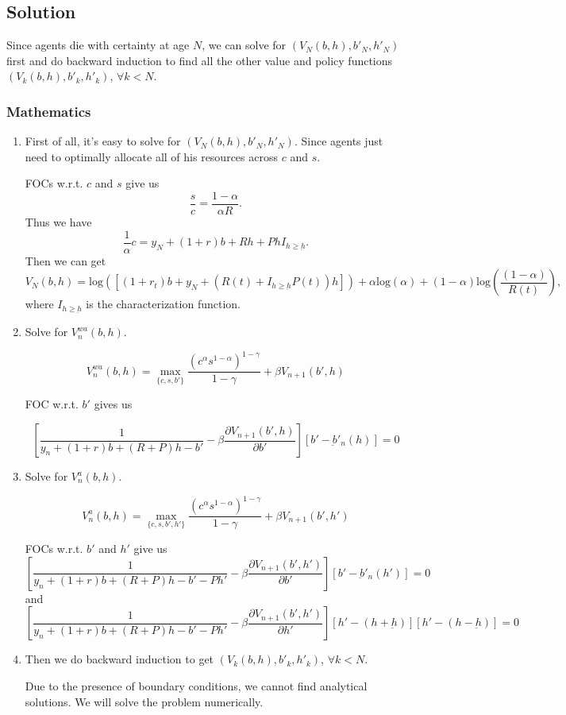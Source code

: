 \documentclass[a4paper,10pt]{article}
\newif\iffudongxingtongonly
\begin{document}
\iffudongxingtongonly
NTGB: What is the relationship between $P$ and $R$? Relatedly, how can we guarantee no one will hold a house level $0<h<\underbar{h}$ ever?
\fi

\pagebreak



\subsection*{Solution}

Since agents die with certainty at age $N$, we can solve for $(V_N(b,h),b'_N,h'_N)$ first and do backward induction to find all the other value and policy functions $(V_k(b,h),b'_k,h'_k)$, $\forall k<N$.


\subsubsection*{Mathematics}

\begin{enumerate}
  \item First of all, it's easy to solve for $(V_N(b,h),b'_N,h'_N)$. Since agents just need to optimally allocate all of his resources across $c$ and $s$.

  FOCs w.r.t. $c$ and $s$ give us
\[
\frac{s}{c}= \frac{1-\alpha}{\alpha R}.
\]
Thus we have
\[
\frac{1}{\alpha}c= y_N+(1+r)b+Rh+PhI_{h\ge\underbar{h}}.
\]
Then we can get
\[
V_N(b,h) = \mbox{log}([(1+r_t)b+y_N+(R(t)+I_{h\ge\underbar{h}} P(t))h])+\alpha\mbox{log}(\alpha)+(1-\alpha)\mbox{log}(\frac{(1-\alpha)}{R(t)}),
\]
 where $I_{h\ge\underbar{h}}$ is the characterization function.
  \item Solve for $V_n^{wa}(b,h)$.

\[
V_n^{wa}(b,h) = \max_{\{c, s, b'\}}  \frac{(c^\alpha s^{1-\alpha})^{1-\gamma}}{1-\gamma} + \beta V_{n+1}(b',h)
\]

FOC w.r.t. $b'$ gives us

\[
[\frac{1}{y_n+(1+r)b+(R+P)h-b'} - \beta \frac{\partial V_{n+1}(b',h)}{\partial b'}][b'-\underbar{b}'_n(h)]=0
\]


  \item Solve for $V_n^{a}(b,h)$.

  \[
V_n^{a}(b,h) = \max_{\{c, s, b',h'\}}  \frac{(c^\alpha s^{1-\alpha})^{1-\gamma}}{1-\gamma} + \beta V_{n+1}(b',h')
\]

FOCs w.r.t. $b'$ and $h'$ give us
\[
[\frac{1}{y_n+(1+r)b+(R+P)h-b'-Ph'} - \beta \frac{\partial V_{n+1}(b',h')}{\partial b'}][b'-\underbar{b}'_n(h')]=0
\]
and
\[
[\frac{1}{y_n+(1+r)b+(R+P)h-b'-Ph'} - \beta \frac{\partial V_{n+1}(b',h')}{\partial h'}][h'-(h+\underbar{h})][h'-(h-\underbar{h})]=0
\]

\item Then we do backward induction to get $(V_k(b,h),b'_k,h'_k)$, $\forall k<N$.

Due to the presence of boundary conditions, we cannot find analytical solutions. We will solve the problem numerically.

\end{enumerate}
\end{document}
